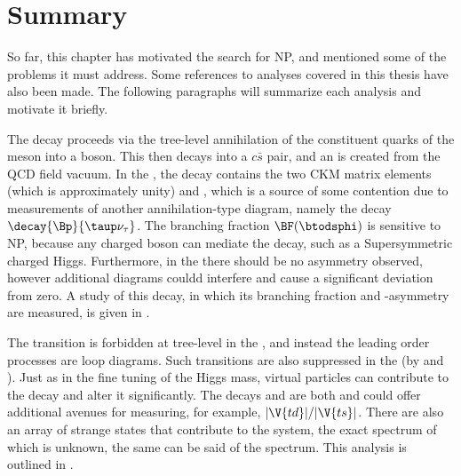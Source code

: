\section{Summary}

So far, this chapter has motivated the search for NP, and mentioned some of the problems it must
address.
Some references to analyses covered in this thesis have also been made.
The following paragraphs will summarize each analysis and motivate it briefly.

        The decay \btodsphi proceeds via the tree-level annihilation of the constituent quarks of
        the \Bp meson into a \Wp boson.
        This then decays into a $c\bar s$ pair, and an \ssbar is created from the QCD field vacuum.
        In the \sm, the decay contains the two CKM matrix elements  (which is approximately
        unity) and
        , which is a source of some contention due to measurements of another
        annihilation-type diagram, namely the decay $\decay{\Bp}{\taup\nu_\tau}$.
        The branching fraction $\BF(\btodsphi)$ is sensitive to NP, because any charged boson can
        mediate
        the decay, such as a Supersymmetric charged Higgs.
        Furthermore, in the \sm there should be no \CP asymmetry observed, however additional
        diagrams couldd
        interfere and cause a significant deviation from zero.
        A study of this decay, in which its branching fraction and \CP-asymmetry are measured, is
        given in
        .

        The \fcnc transition  is forbidden at tree-level in the \sm, and instead
        the leading order processes are loop diagrams.
        Such transitions are also \ckm suppressed in the \sm (by  and ).
        Just as in the fine tuning of the Higgs mass, virtual \bsm particles can contribute to the
        decay and
        alter it significantly.
        The decays \btokpipimumu and \btophikmumu are both   and could offer
        additional avenues for measuring, for example, $|\V{td}|/|\V{ts}|$.
        There are also an array of strange states that contribute to the \kpipi system, the exact
        spectrum of which is unknown, the same can be said of the \phik spectrum.
        This analysis is outlined in .

